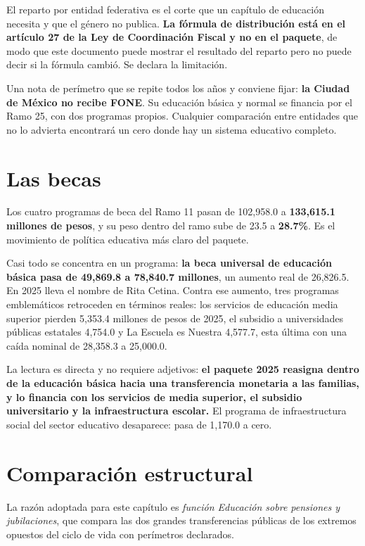 El reparto por entidad federativa es el corte que un capítulo de educación
necesita y que el género no publica. \textbf{La fórmula de distribución está en el
artículo 27 de la Ley de Coordinación Fiscal y no en el paquete}, de modo que este
documento puede mostrar el resultado del reparto pero no puede decir si la fórmula
cambió. Se declara la limitación.

Una nota de perímetro que se repite todos los años y conviene fijar: \textbf{la
Ciudad de México no recibe FONE}. Su educación básica y normal se financia por el
Ramo 25, con dos programas propios. Cualquier comparación entre entidades que no
lo advierta encontrará un cero donde hay un sistema educativo completo.

\section{Las becas}

Los cuatro programas de beca del Ramo 11 pasan de 102,958.0 a \textbf{133,615.1
millones de pesos}, y su peso dentro del ramo sube de 23.5 a \textbf{28.7\%}. Es
el movimiento de política educativa más claro del paquete.

Casi todo se concentra en un programa: \textbf{la beca universal de educación
básica pasa de 49,869.8 a 78,840.7 millones}, un aumento real de 26,826.5. En 2025
lleva el nombre de Rita Cetina. Contra ese aumento, tres programas emblemáticos
retroceden en términos reales: los servicios de educación media superior pierden
5,353.4 millones de pesos de 2025, el subsidio a universidades públicas estatales
4,754.0 y La Escuela es Nuestra 4,577.7, esta última con una caída nominal de
28,358.3 a 25,000.0.

La lectura es directa y no requiere adjetivos: \textbf{el paquete 2025 reasigna
dentro de la educación básica hacia una transferencia monetaria a las familias, y
lo financia con los servicios de media superior, el subsidio universitario y la
infraestructura escolar.} El programa de infraestructura social del sector
educativo desaparece: pasa de 1,170.0 a cero.

\section{Comparación estructural}

La razón adoptada para este capítulo es \emph{función Educación sobre pensiones y
jubilaciones}, que compara las dos grandes transferencias públicas de los extremos
opuestos del ciclo de vida con perímetros declarados.


